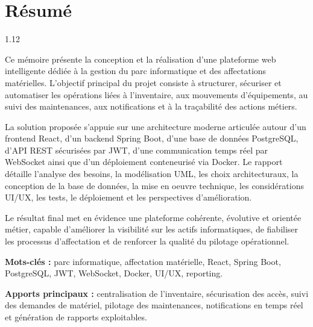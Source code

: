﻿\documentclass[12pt,a4paper,oneside]{report}
\newcommand{\frontmatterchapter}[1]{
  \chapter*{#1}
  \addcontentsline{toc}{chapter}{#1}
}
\newenvironment{frontmattertext}{
  \begin{spacing}{1.12}
  \normalsize
  \setlength{\parskip}{0.45em}
}{
  \end{spacing}
}
\begin{document}
\frontmatterchapter{Résumé}
\begin{frontmattertext}
Ce mémoire présente la conception et la réalisation d'une plateforme web intelligente dédiée à la gestion du parc informatique et des affectations matérielles. L'objectif principal du projet consiste à structurer, sécuriser et automatiser les opérations liées à l'inventaire, aux mouvements d'équipements, au suivi des maintenances, aux notifications et à la traçabilité des actions métiers.

La solution proposée s'appuie sur une architecture moderne articulée autour d'un frontend React, d'un backend Spring Boot, d'une base de données PostgreSQL, d'API REST sécurisées par JWT, d'une communication temps réel par WebSocket ainsi que d'un déploiement conteneurisé via Docker. Le rapport détaille l'analyse des besoins, la modélisation UML, les choix architecturaux, la conception de la base de données, la mise en oeuvre technique, les considérations UI/UX, les tests, le déploiement et les perspectives d'amélioration.

Le résultat final met en évidence une plateforme cohérente, évolutive et orientée métier, capable d'améliorer la visibilité sur les actifs informatiques, de fiabiliser les processus d'affectation et de renforcer la qualité du pilotage opérationnel.

\textbf{Mots-clés :} parc informatique, affectation matérielle, React, Spring Boot, PostgreSQL, JWT, WebSocket, Docker, UI/UX, reporting.

\textbf{Apports principaux :} centralisation de l'inventaire, sécurisation des accès, suivi des demandes de matériel, pilotage des maintenances, notifications en temps réel et génération de rapports exploitables.
\end{frontmattertext}
\end{document}
